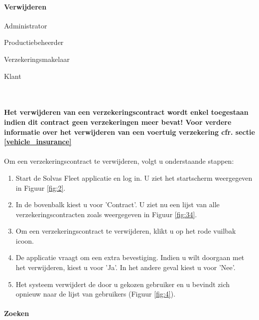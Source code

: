 \documentclass[11pt,openany]{article}
\newcommand{\cmark}{\ding{51}}%
\newcommand{\xmark}{\ding{55}}%
\newcommand{\done}{\rlap{$\square$}{\raisebox{2pt}{\large\hspace{1pt}\cmark}}%
	\hspace{-2.5pt}}
\newcommand{\wontfix}{\rlap{$\square$}{\large\hspace{1pt}\xmark}}
\begin{document}
\paragraph{Verwijderen}
\begin{todolist}
	\item[\done] Administrator
	\item[\done] Productiebeheerder
	\item[\done] Verzekeringsmakelaar
	\item[\wontfix] Klant 
\end{todolist}
\\
\\
\textbf{Het verwijderen van een verzekeringscontract wordt enkel toegestaan indien dit contract geen verzekeringen meer bevat! Voor verdere informatie over het verwijderen van een voertuig verzekering cfr. sectie \ref{vehicle_insurance}}
\\
\\
Om een verzekeringscontract te verwijderen, volgt u onderstaande stappen:
\begin{enumerate}
	\item Start de Solvas Fleet applicatie en log in. U ziet het startscherm weergegeven in Figuur \ref{fig:2}.
	\item In de bovenbalk kiest u voor 'Contract'. U ziet nu een lijst van alle verzekeringscontracten zoals weergegeven in Figuur \ref{fig:34}.
	\item Om een verzekeringscontract te verwijderen, klikt u op het rode vuilbak icoon.
	\item De applicatie vraagt om een extra bevestiging. Indien u wilt doorgaan met het verwijderen, kiest u voor 'Ja'. In het andere geval kiest u voor 'Nee'.
	\item Het systeem verwijdert de door u gekozen gebruiker en u bevindt zich opnieuw naar de lijst van gebruikers (Figuur \ref{fig:4}).
\end{enumerate}

\paragraph{Zoeken}
\end{document}
